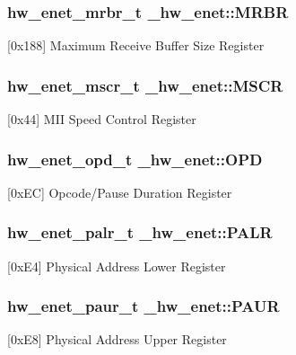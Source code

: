 \subsubsection[{\texorpdfstring{M\+R\+BR}{MRBR}}]{ {\bf hw\+\_\+enet\+\_\+mrbr\+\_\+t} \+\_\+hw\+\_\+enet\+::\+M\+R\+BR}\hypertarget{struct__hw__enet_ae8fadb1bc74d3e79e51307412c7da94d}{}\label{struct__hw__enet_ae8fadb1bc74d3e79e51307412c7da94d}
\mbox{[}0x188\mbox{]} Maximum Receive Buffer Size Register 
\subsubsection[{\texorpdfstring{M\+S\+CR}{MSCR}}]{ {\bf hw\+\_\+enet\+\_\+mscr\+\_\+t} \+\_\+hw\+\_\+enet\+::\+M\+S\+CR}\hypertarget{struct__hw__enet_a32b9b28dc903cd2ab5565a59c5700317}{}\label{struct__hw__enet_a32b9b28dc903cd2ab5565a59c5700317}
\mbox{[}0x44\mbox{]} M\+II Speed Control Register 
\subsubsection[{\texorpdfstring{O\+PD}{OPD}}]{ {\bf hw\+\_\+enet\+\_\+opd\+\_\+t} \+\_\+hw\+\_\+enet\+::\+O\+PD}\hypertarget{struct__hw__enet_af791754dda3041d306c07e49e2b6139a}{}\label{struct__hw__enet_af791754dda3041d306c07e49e2b6139a}
\mbox{[}0x\+EC\mbox{]} Opcode/\+Pause Duration Register 
\subsubsection[{\texorpdfstring{P\+A\+LR}{PALR}}]{ {\bf hw\+\_\+enet\+\_\+palr\+\_\+t} \+\_\+hw\+\_\+enet\+::\+P\+A\+LR}\hypertarget{struct__hw__enet_ac6705bc3c8a9e5c3ce3fa37257196f48}{}\label{struct__hw__enet_ac6705bc3c8a9e5c3ce3fa37257196f48}
\mbox{[}0x\+E4\mbox{]} Physical Address Lower Register 
\subsubsection[{\texorpdfstring{P\+A\+UR}{PAUR}}]{ {\bf hw\+\_\+enet\+\_\+paur\+\_\+t} \+\_\+hw\+\_\+enet\+::\+P\+A\+UR}\hypertarget{struct__hw__enet_a60691a644e626d6868104bb809159a46}{}\label{struct__hw__enet_a60691a644e626d6868104bb809159a46}
\mbox{[}0x\+E8\mbox{]} Physical Address Upper Register 
